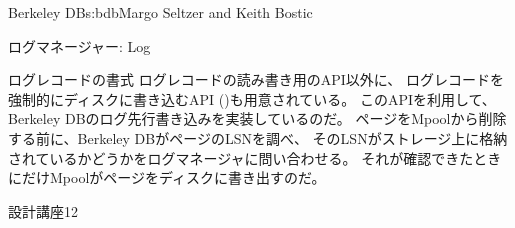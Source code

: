\begin{aosachapter}{Berkeley DB}{s:bdb}{Margo Seltzer and Keith Bostic}
\begin{aosasect1}{ログマネージャー: Log}
\begin{aosasect2}{ログレコードの書式}
ログレコードの読み書き用のAPI以外に、
ログレコードを強制的にディスクに書き込むAPI
()も用意されている。
このAPIを利用して、Berkeley DBのログ先行書き込みを実装しているのだ。
ページをMpoolから削除する前に、Berkeley DBがページのLSNを調べ、
そのLSNがストレージ上に格納されているかどうかをログマネージャに問い合わせる。
それが確認できたときにだけMpoolがページをディスクに書き出すのだ。

\begin{aosabox}{設計講座12}


\end{aosabox}
\end{aosasect2}
\end{aosasect1}
\end{aosachapter}
